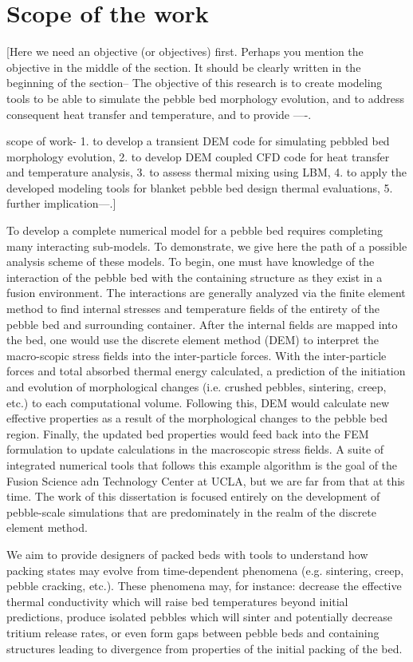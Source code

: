 \section{Scope of the work}\label{sec:intro-scope-of-work}
[Here we need an objective (or objectives) first. Perhaps you mention the objective in the middle of the section. It should be clearly written in the beginning of the section-- The objective of this research is to create modeling tools to be able to simulate the pebble bed morphology evolution, and to address consequent heat transfer and temperature, and to provide ----. 

scope of work- 1. to develop a transient DEM code for simulating pebbled bed morphology evolution, 2. to develop DEM coupled CFD code for heat transfer and temperature analysis, 3. to assess thermal mixing using LBM, 4. to apply the developed modeling tools for blanket pebble bed design thermal evaluations, 5. further implication---.]

To develop a complete numerical model for a pebble bed requires completing many interacting sub-models. To demonstrate, we give here the path of a possible analysis scheme of these models. To begin, one must have knowledge of the interaction of the pebble bed with the containing structure as they exist in a fusion environment. The interactions are generally analyzed via the finite element method to find internal stresses and temperature fields of the entirety of the pebble bed and surrounding container. After the internal fields are mapped into the bed, one would use the discrete element method (DEM) to interpret the macro-scopic stress fields into the inter-particle forces. With the inter-particle forces and total absorbed thermal energy calculated, a prediction of the initiation and evolution of morphological changes (i.e. crushed pebbles, sintering, creep, etc.) to each computational volume. Following this, DEM would calculate new effective properties as a result of the morphological changes to the pebble bed region. Finally, the updated bed properties would feed back into the FEM formulation to update calculations in the macroscopic stress fields. A suite of integrated numerical tools that follows this example algorithm is the goal of the Fusion Science adn Technology Center at UCLA, but we are far from that at this time. The work of this dissertation is focused entirely on the development of pebble-scale simulations that are predominately in the realm of the discrete element method.

We aim to provide designers of packed beds with tools to understand how packing states may evolve from time-dependent phenomena (e.g. sintering, creep, pebble cracking, etc.). These phenomena may, for instance: decrease the effective thermal conductivity which will raise bed temperatures beyond initial predictions, produce isolated pebbles which will sinter and potentially decrease tritium release rates, or even form gaps between pebble beds and containing structures leading to divergence from properties of the initial packing of the bed.

